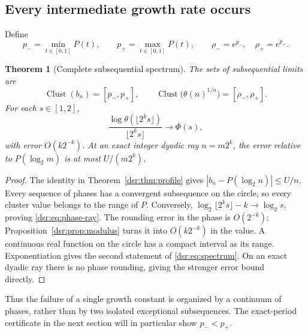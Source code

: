 \documentclass[11pt,a4paper]{article}
\numberwithin{equation}{section}
\newtheorem{theorem}{Theorem}[section]
\theoremstyle{definition}
\theoremstyle{remark}
\newcommand{\clust}{\operatorname{Clust}}
\theoremstyle{definition}
\theoremstyle{plain}
\begin{document}
\subsection{Every intermediate growth rate occurs}
Define
\begin{equation}
 p_- =\min_{t\in[0,1]}P(t),\qquad p_+=\max_{t\in[0,1]}P(t),\qquad
 \rho_-=e^{p_-},\quad\rho_+=e^{p_+}.
\end{equation}

\begin{theorem}[Complete subsequential spectrum]
\label{dsr:thm:spectrum}
The sets of subsequential limits are
\begin{equation}
 \clust(b_n)=[p_-,p_+],\qquad
 \clust\bigl(\theta(n)^{1/n}\bigr)=[\rho_-,\rho_+].
\label{dsr:eq:spectrum}
\end{equation}
For each $s\in[1,2]$,
\begin{equation}
 \frac{\log\theta(\lfloor2^ks\rfloor)}{\lfloor2^ks\rfloor}
 \longrightarrow\Phi(s),
\label{dsr:eq:phase-ray}
\end{equation}
with error $O(k2^{-k})$. At an exact integer dyadic ray $n=m2^k$, the error
relative to $P(\log_2m)$ is at most $U/(m2^k)$.
\end{theorem}
\begin{proof}
The identity in Theorem~\ref{dsr:thm:profile} gives
$|b_n-P(\log_2n)|\le U/n$. Every sequence of phases has a convergent
subsequence on the circle, so every cluster value belongs to the range of
$P$. Conversely, $\log_2\lfloor2^ks\rfloor-k\to\log_2s$, proving
\eqref{dsr:eq:phase-ray}. The rounding error in the phase is $O(2^{-k})$;
Proposition~\ref{dsr:prop:modulus} turns it into $O(k2^{-k})$ in the value.
A continuous real function on the circle has a compact interval as its
range. Exponentiation gives the second statement of \eqref{dsr:eq:spectrum}.
On an exact dyadic ray there is no phase rounding, giving the stronger error
bound directly.
\end{proof}
Thus the failure of a single growth constant is organized by a continuum of
phases, rather than by two isolated exceptional subsequences. The exact-period
certificate in the next section will in particular show $p_-<p_+$.
\end{document}

